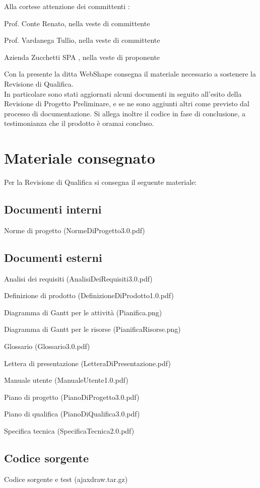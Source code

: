 Alla cortese attenzione dei committenti :
\begin{list}{-}{}
\item Prof. Conte Renato, nella veste di committente
\item Prof. Vardanega Tullio, nella veste di committente
\item Azienda Zucchetti SPA , nella veste di proponente
\end{list}

Con la presente la ditta WebShape consegna il materiale necessario a sostenere la Revisione di Qualifica. \\
In particolare sono stati aggiornati alcuni documenti in seguito all'esito della Revisione di Progetto Preliminare, e se ne sono aggiunti altri come previsto dal processo di documentazione. Si allega inoltre il codice in fase di conclusione, a testimonianza che il prodotto \`e oramai concluso.


\section{Materiale consegnato}
Per la Revisione di Qualifica si consegna il seguente materiale: 
\subsection{Documenti interni}
\begin{list}{-}{}
\item Norme di progetto (NormeDiProgetto3.0.pdf)
\end{list}
\subsection{Documenti esterni}
\begin{list}{-}{}
\item Analisi dei requisiti (AnalisiDeiRequisiti3.0.pdf)
\item Definizione di prodotto (DefinizioneDiProdotto1.0.pdf)
\item Diagramma di Gantt per le attivit\`a (Pianifica.png)
\item Diagramma di Gantt per le risorse (PianificaRisorse.png)
\item Glossario (Glossario3.0.pdf)
\item Lettera di presentazione (LetteraDiPresentazione.pdf)
\item Manuale utente (ManualeUtente1.0.pdf)
\item Piano di progetto (PianoDiProgetto3.0.pdf)
\item Piano di qualifica (PianoDiQualifica3.0.pdf)
\item Specifica tecnica (SpecificaTecnica2.0.pdf)
\end{list}
\subsection{Codice sorgente}
\begin{list}{-}{}
\item Codice sorgente e test (ajaxdraw.tar.gz)
\end{list}



